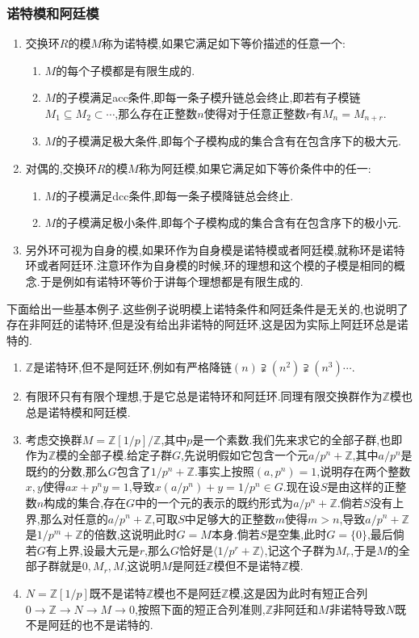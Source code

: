 \subsubsection{诺特模和阿廷模}
\begin{enumerate}
	\item 交换环$R$的模$M$称为诺特模,如果它满足如下等价描述的任意一个:
		\begin{enumerate}
			\item $M$的每个子模都是有限生成的.
			\item $M$的子模满足acc条件,即每一条子模升链总会终止,即若有子模链$M_1\subseteq M_2\subset\cdots$,那么存在正整数$n$使得对于任意正整数$r$有$M_n=M_ {n+r}$.
			\item $M$的子模满足极大条件,即每个子模构成的集合含有在包含序下的极大元.
		\end{enumerate}
	\item 对偶的,交换环$R$的模$M$称为阿廷模,如果它满足如下等价条件中的任一:
		\begin{enumerate}
			\item $M$的子模满足dcc条件,即每一条子模降链总会终止.
			\item $M$的子模满足极小条件,即每个子模构成的集合含有在包含序下的极小元.
		\end{enumerate}
	\item 另外环可视为自身的模,如果环作为自身模是诺特模或者阿廷模,就称环是诺特环或者阿廷环.注意环作为自身模的时候,环的理想和这个模的子模是相同的概念.于是例如有诺特环等价于讲每个理想都是有限生成的.
\end{enumerate}

下面给出一些基本例子.这些例子说明模上诺特条件和阿廷条件是无关的,也说明了存在非阿廷的诺特环,但是没有给出非诺特的阿廷环,这是因为实际上阿廷环总是诺特的.
\begin{enumerate}
	\item $\mathbb{Z}$是诺特环,但不是阿廷环,例如有严格降链$(n)\supsetneqq(n^2)\supsetneqq(n^3)\cdots$.
	\item 有限环只有有限个理想,于是它总是诺特环和阿廷环.同理有限交换群作为$\mathbb{Z}$模也总是诺特模和阿廷模.
	\item 考虑交换群$M=\mathbb{Z}[1/p]/\mathbb{Z}$,其中$p$是一个素数.我们先来求它的全部子群,也即作为$\mathbb{Z}$模的全部子模.给定子群$G$,先说明假如它包含一个元$a/p^n+\mathbb{Z}$,其中$a/p^n$是既约的分数,那么$G$包含了$1/p^n+\mathbb{Z}$.事实上按照$(a,p^n)=1$,说明存在两个整数$x,y$使得$ax+p^ny=1$,导致$x(a/p^n)+y=1/p^n\in G$.现在设$S$是由这样的正整数$n$构成的集合,存在$G$中的一个元的表示的既约形式为$a/p^n+\mathbb{Z}$.倘若$S$没有上界,那么对任意的$a/p^n+\mathbb{Z}$,可取$S$中足够大的正整数$m$使得$m>n$,导致$a/p^n+\mathbb{Z}$是$1/p^m+\mathbb{Z}$的倍数,这说明此时$G=M$本身.倘若$S$是空集,此时$G=\{0\}$,最后倘若$G$有上界,设最大元是$r$,那么$G$恰好是$\langle 1/p^r+\mathbb{Z}\rangle$,记这个子群为$M_r$,于是$M$的全部子群就是$0,M_r,M$,这说明$M$是阿廷$\mathbb{Z}$模但不是诺特$\mathbb{Z}$模.
	\item $N=\mathbb{Z}[1/p]$既不是诺特$\mathbb{Z}$模也不是阿廷$\mathbb{Z}$模,这是因为此时有短正合列$0\to\mathbb{Z}\to N\to M\to0$,按照下面的短正合列准则,$\mathbb{Z}$非阿廷和$M$非诺特导致$N$既不是阿廷的也不是诺特的.
\end{enumerate}
